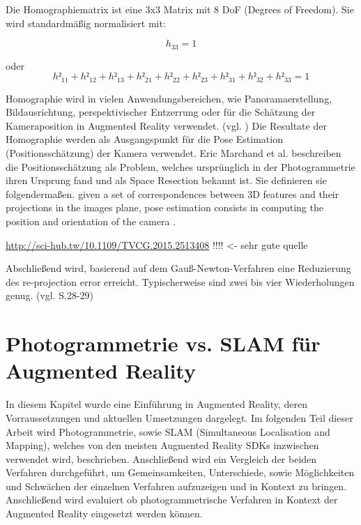 Die Homographiematrix ist eine 3x3 Matrix mit 8 DoF (Degrees of Freedom). Sie wird standardmäßig normalisiert mit: 

\begin{equation}
h_33 = 1
\end{equation}

oder 
\begin{equation}
h²_{11} + h²_{12} + h²_{13} + h²_{21} + h²_{22} + h²_{23} + h²_{31} + h²_{32} + h²_{33} = 1
\end{equation}

Homographie wird in vielen Anwendungsbereichen, wie Panoramaerstellung, Bildausrichtung, perspektivischer Entzerrung oder für die Schätzung der Kameraposition in Augmented Reality verwendet. (vgl. \cite{homography}) Die Resultate der Homographie werden als Ausgangspunkt für die \glqq Pose Estimation\grqq{} (Positionsschätzung) der Kamera verwendet.  Eric Marchand et al. beschreiben die Positionsschätzung als Problem, welches ursprünglich in der Photogrammetrie ihren Ursprung fand und als \glqq Space Resection\grqq{} bekannt ist. Sie definieren sie folgendermaßen. \glqq given a set of correspondences between 3D
features and their projections in the images plane, pose estimation
consists in computing the position and orientation of the camera \grqq{}.

\url{http://sci-hub.tw/10.1109/TVCG.2015.2513408} !!!! <- sehr gute quelle

 Abschließend wird, basierend auf dem Gauß-Newton-Verfahren eine Reduzierung des \glqq re-projection error\grqq{} erreicht. Typischerweise sind zwei bis vier Wiederholungen genug. (vgl. \cite{natural_feature} S.28-29)

\section{Photogrammetrie vs. SLAM für Augmented Reality}

In diesem Kapitel wurde eine Einführung in Augmented Reality, deren Vorraussetzungen und aktuellen Umsetzungen dargelegt. Im folgenden Teil dieser Arbeit wird Photogrammetrie, sowie SLAM (Simultaneous Localisation and Mapping), welches von den meisten Augmented Reality SDKs inzwischen verwendet wird, beschrieben. Anschließend wird ein Vergleich der beiden Verfahren durchgeführt, um Gemeinsamkeiten, Unterschiede, sowie Möglichkeiten und Schwächen der einzelnen Verfahren aufzuzeigen und in Kontext zu bringen. Anschließend wird evaluiert ob photogrammetrische Verfahren in Kontext der Augmented Reality eingesetzt werden können.

